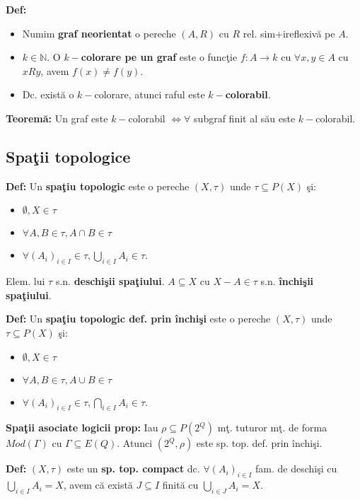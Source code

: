 \documentclass{article}
\begin{document}
\textbf{Def:}
\begin{itemize}
    \item Numim \textbf{graf neorientat} o pereche $(A,R)$ cu $R$ rel. sim+ireflexiv\u a pe $A$.
    \item $k\in\mathbb N$. O \textbf{$k-$colorare pe un graf} este o func\c tie $f:A\rightarrow k$ cu $\forall x,y\in A$ cu $xRy$, avem $f(x)\neq f(y)$.
    \item Dc. exist\u a o $k-$colorare, atunci raful este \textbf{$k-$colorabil}.
\end{itemize}

\textbf{Teorem\u a:} Un graf este $k-$colorabil $\iff \forall$ subgraf finit al s\u au este $k-$colorabil.

\subsection{Spa\c tii topologice}

\textbf{Def:} Un \textbf{spa\c tiu topologic} este o pereche $(X,\tau)$ unde $\tau\subseteq P(X)$ \c si:
\begin{itemize}
    \item $\emptyset,X\in \tau$
    \item $\forall A,B\in\tau,A\cap B\in \tau$
    \item $\forall(A_i)_{i\in I}\in\tau,\bigcup_{i\in I}A_i\in\tau$.
\end{itemize}
Elem. lui $\tau$ s.n. \textbf{deschi\c sii spa\c tiului}. $A\subseteq X$ cu $X-A\in \tau$ s.n. \textbf{\^ inchi\c sii spa\c tiului}.

\textbf{Def:} Un \textbf{spa\c tiu topologic def. prin \^ inchi\c si} este o pereche $(X,\tau)$ unde $\tau\subseteq P(X)$ \c si:
\begin{itemize}
    \item $\emptyset,X\in \tau$
    \item $\forall A,B\in\tau,A\cup B\in \tau$
    \item $\forall(A_i)_{i\in I}\in\tau,\bigcap_{i\in I}A_i\in\tau$.
\end{itemize}

\textbf{Spa\c tii asociate logicii prop:} Iau $\rho\subseteq P(2^Q)$ m\c t. tuturor m\c t. de forma $Mod(\Gamma)$ cu $\Gamma\subseteq E(Q)$. Atunci $(2^Q,\rho)$ este sp. top. def. prin \^ inchi\c si.

\textbf{Def:} $(X,\tau)$ este un \textbf{sp. top. compact} dc. $\forall (A_i)_{i\in I}$ fam. de deschi\c si cu $\bigcup_{i\in I}A_i=X$, avem c\u a exist\u a $J\subseteq I$ finit\u a cu $\bigcup_{i\in J}A_i=X$.
\end{document}
